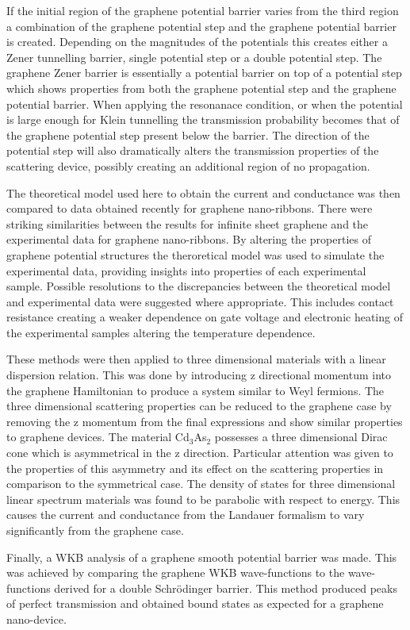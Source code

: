 		If the initial region of the graphene potential barrier varies from the third region a combination of the graphene potential step and the graphene potential barrier is created. Depending on the magnitudes of the potentials this creates either a Zener tunnelling barrier, single potential step or a double potential step. The graphene Zener barrier is essentially a potential barrier on top of a potential step which shows properties from both the graphene potential step and the graphene potential barrier. When applying the resonanace condition, or when the potential is large enough for Klein tunnelling the transmission probability becomes that of the graphene potential step present below the barrier. The direction of the potential step will also dramatically alters the transmission properties of the scattering device, possibly creating an additional region of no propagation.

		The theoretical model used here to obtain the current and conductance was then compared to data obtained recently for graphene nano-ribbons. There were striking similarities between the results for infinite sheet graphene and the experimental data for graphene nano-ribbons. By altering the properties of graphene potential structures the theroretical model was used to simulate the experimental data, providing insights into properties of each experimental sample. Possible resolutions to the discrepancies between the theoretical model and experimental data were suggested where appropriate. This includes contact resistance creating a weaker dependence on gate voltage and electronic heating of the experimental samples altering the temperature dependence.

		These methods were then applied to three dimensional materials with a linear dispersion relation. This was done by introducing z directional momentum into the graphene Hamiltonian to produce a system similar to Weyl fermions. The three dimensional scattering properties can be reduced to the graphene case by removing the z momentum from the final expressions and show similar properties to graphene devices. The material Cd$_{3}$As$_{2}$ possesses a three dimensional Dirac cone which is asymmetrical in the z direction. Particular attention was given to the properties of this asymmetry and its effect on the scattering properties in comparison to the symmetrical case. The density of states for three dimensional linear spectrum materials was found to be parabolic with respect to energy. This causes the current and conductance from the Landauer formalism to vary significantly from the graphene case.

		Finally, a WKB analysis of a graphene smooth potential barrier was made. This was achieved by comparing the graphene WKB wave-functions to the wave-functions derived for a double Schr{\" o}dinger barrier. This method produced peaks of perfect transmission and obtained bound states as expected for a graphene nano-device.
%
